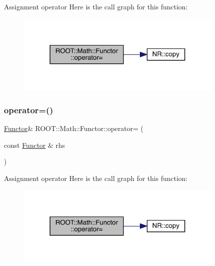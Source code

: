 Assignment operator Here is the call graph for this function\+:
\nopagebreak
\begin{figure}[H]
\begin{center}
\leavevmode
\includegraphics[width=284pt]{da/d8e/classROOT_1_1Math_1_1Functor_a24bd9cdf7e31e443bff64c5fb4378c99_cgraph}
\end{center}
\end{figure}
\mbox{\label{classROOT_1_1Math_1_1Functor_a24bd9cdf7e31e443bff64c5fb4378c99}} 
\subsubsection{\texorpdfstring{operator=()}{operator=()}\hspace{0.1cm}{\footnotesize\ttfamily [2/3]}}
{\footnotesize\ttfamily \mbox{\hyperlink{classROOT_1_1Math_1_1Functor}{Functor}}\& R\+O\+O\+T\+::\+Math\+::\+Functor\+::operator= (\begin{DoxyParamCaption}\item[{const \mbox{\hyperlink{classROOT_1_1Math_1_1Functor}{Functor}} \&}]{rhs }\end{DoxyParamCaption})\hspace{0.3cm}{\ttfamily [inline]}}

Assignment operator Here is the call graph for this function\+:
\nopagebreak
\begin{figure}[H]
\begin{center}
\leavevmode
\includegraphics[width=284pt]{da/d8e/classROOT_1_1Math_1_1Functor_a24bd9cdf7e31e443bff64c5fb4378c99_cgraph}
\end{center}
\end{figure}
\mbox{\label{classROOT_1_1Math_1_1Functor_a24bd9cdf7e31e443bff64c5fb4378c99}} 
